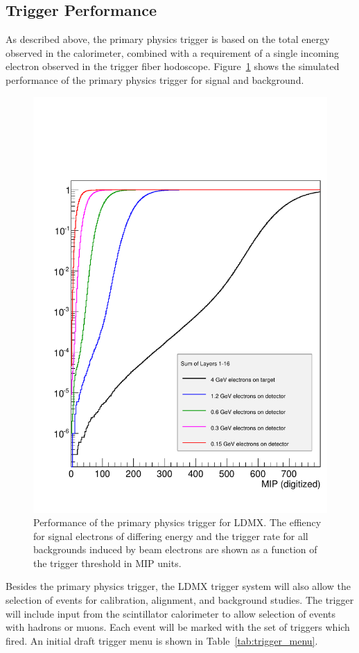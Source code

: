 
\subsection{Trigger Performance}

As described above, the primary physics trigger is based on the total
energy observed in the calorimeter, combined with a requirement of a
single incoming electron observed in the trigger fiber hodoscope.
Figure~\ref{fig:trigger_rejection} shows the simulated performance of
the primary physics trigger for signal and background.

\begin{figure}[t]
  \begin{center}
    \includegraphics[width=0.7\linewidth]{images/trigger/trigger_rates_energy}
    \end{center}
  \caption{Performance of the primary physics trigger for LDMX.  The
    effiency for signal electrons of differing energy and the trigger
    rate for all backgrounds induced by beam electrons are shown as a
    function of the trigger threshold in MIP
    units.}\label{fig:trigger_rejection}
\end{figure}

Besides the primary physics trigger, the LDMX trigger system will also
allow the selection of events for calibration, alignment, and
background studies.  The trigger will include input from the
scintillator calorimeter to allow selection of events with hadrons or
muons.  Each event will be marked with the set of triggers which
fired.  An initial draft trigger menu is shown in Table~\ref{tab:trigger_menu}.

